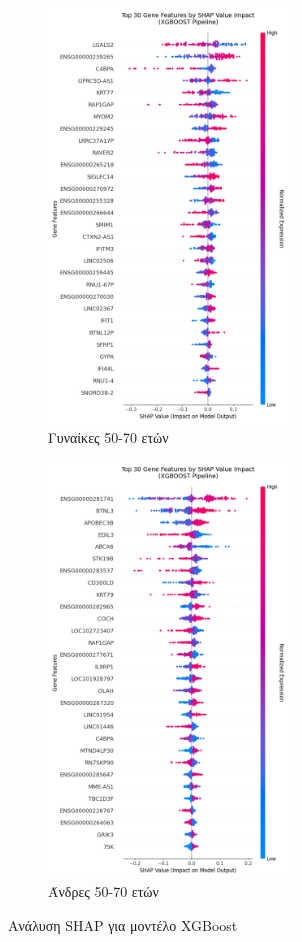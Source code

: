 \documentclass[12pt]{report}
\begin{document}
            \begin{figure}[ht]
                \centering
                \begin{subfigure}[b]{0.45\textwidth}
                    \centering
                    \includegraphics[height=11cm,width=\textwidth,keepaspectratio]{ML/Predict/DEG/SHAP/XGBoost/shap_beeswarm_plot_Female_50-70_useSMOTE_False.png}
                    \caption{Γυναίκες 50-70 ετών}
                    \label{fig:shap_beeswarm_XGB_plot_Female_50-70_useSMOTE_False}
                \end{subfigure}
                \hfill
                \begin{subfigure}[b]{0.45\textwidth}
                    \centering
                    \includegraphics[height=11cm,width=\textwidth,keepaspectratio]{ML/Predict/DEG/SHAP/XGBoost/shap_beeswarm_plot_Male_50-70_useSMOTE_False.png}
                    \caption{Άνδρες 50-70 ετών}
                    \label{fig:shap_beeswarm_XGB_plot_Male_50-70_useSMOTE_False}
                \end{subfigure}
                \caption{Ανάλυση SHAP για μοντέλο XGBoost}
                \label{fig:beeswarm-shap-50-70-xgb-classifier}
            \end{figure}
\end{document}

